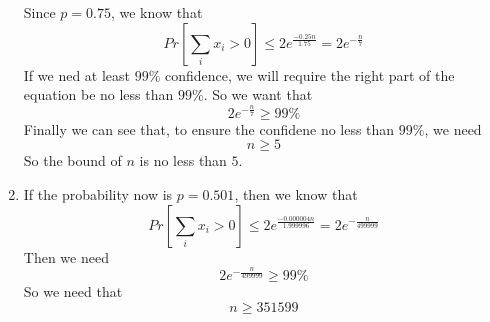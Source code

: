 \documentclass{article}
\begin{document}
\begin{enumerate}
\begin{equation}
				\end{equation}
				Since $p = 0.75$, we know that \begin{equation}
					Pr\left[\sum_ix_i > 0\right]\leq 2e^{\frac{-0.25n}{1.75}} = 2e^{-\frac{n}{7}}
				\end{equation}
				If we ned at least $99\%$ confidence, we will require the right part of the equation be no less than $99\%$. So we want that \begin{equation}
					2e^{-\frac{n}{7}} \geq 99\%
				\end{equation} Finally we can see that, to ensure the confidene no less than $99\%$, we need \begin{equation}
					n \geq 5
				\end{equation}
				So the bound of $n$ is no less than $5$.
			\item If the probability now is $p = 0.501$, then we know that \begin{equation}
				Pr\left[ \sum_i x_i > 0 \right] \leq 2e^{\frac{-0.000004n}{1.999996}} = 2e^{-\frac{n}{499999}}
			\end{equation}
			Then we need \begin{equation}
				2e^{-\frac{n}{499999}} \geq 99\%
			\end{equation}
			So we need that \begin{equation}
				n \geq 351599
			\end{equation}
		\end{enumerate}
\end{document}
